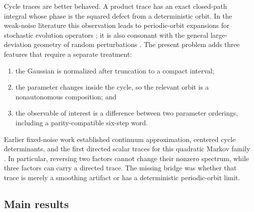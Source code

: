 \documentclass[11pt]{article}
\theoremstyle{remark}
\begin{document}
Cycle traces are better behaved.  A product trace has an exact closed-path
integral whose phase is the squared defect from a deterministic orbit.  In the
weak-noise literature this observation leads to periodic-orbit expansions for
stochastic evolution operators
\citep{CvitanovicEtAl1998,PallaEtAl2001}; it is also consonant with the general
large-deviation geometry of random perturbations
\citep{Kifer1988,FreidlinWentzell2012,DemboZeitouni1998}.  The present problem
adds three features that require a separate treatment:
\begin{enumerate}[label=(\roman*),leftmargin=2.2em]
 \item the Gaussian is normalized after truncation to a compact interval;
 \item the parameter changes inside the cycle, so the relevant orbit is a
 nonautonomous composition; and
 \item the observable of interest is a difference between two parameter
 orderings, including a parity-compatible six-step word.
\end{enumerate}

Earlier fixed-noise work established continuum approximation, centered cycle
determinants, and the first directed scalar traces for this quadratic Markov
family \citep{WangContinuum2026,WangCycle2026,WangTimeOrdered2026}.  In
particular, reversing two factors cannot change their nonzero spectrum, while
three factors can carry a directed trace.  The missing bridge was whether that
trace is merely a smoothing artifact or has a deterministic periodic-orbit
limit.

\subsection*{Main results}
\end{document}
